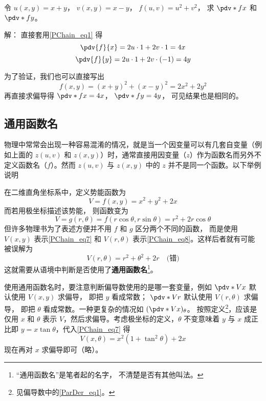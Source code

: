 \begin{example}{}
令 $u(x,y) = x + y$， $v(x,y) = x - y$， $f(u, v) = u^2 + v^2$， 求 $\pdv*{f}{x}$ 和 $\pdv*{f}{y}$。

解： 直接套用\autoref{PChain_eq1} 得
\begin{equation}
\pdv{f}{x} = 2u \cdot 1 + 2v \cdot 1 = 4x
\end{equation}
\begin{equation}
\pdv{f}{y} = 2u \cdot 1 + 2v \cdot (-1) = 4y
\end{equation}

为了验证，我们也可以直接写出
\begin{equation}
f(x, y) = (x+y)^2 + (x-y)^2 = 2x^2 + 2y^2
\end{equation}
再直接求偏导得 $\pdv*{f}{x} = 4x$， $\pdv*{f}{y} = 4y$， 可见结果也是相同的。
\end{example}

\subsection{通用函数名}
物理中常常会出现一种容易混淆的情况，就是当一个因变量可以有几套自变量（例如上面的 $z(u,v)$ 和 $z(x,y)$）时，通常直接用因变量（$z$）作为函数名而另外不定义函数名（$f$）。然而 $z(u,v)$ 与 $z(x,y)$ 中的 $z$ 并不是同一个函数。以下举例说明

\begin{example}{}\label{PChain_ex1}
在二维直角坐标系中，定义势能函数为
\begin{equation}\label{PChain_eq7}
V=f(x,y)=x^2+y^2+2x
\end{equation}
而若用极坐标描述该势能， 则函数变为
\begin{equation}\label{PChain_eq8}
V = g(r,\theta) = f(r\cos \theta , r\sin \theta ) = r^2 + 2r\cos \theta
\end{equation}
但许多物理书为了表述方便并不用 $f$ 和 $g$ 区分两个不同的函数， 而是使用 $V(x,y)$ 表示\autoref{PChain_eq7} 和 $V(r,\theta)$ 表示\autoref{PChain_eq8}。这样后者就有可能被误解为
\begin{equation}
V(r,\theta) = r^2+\theta^2+2r \quad \text{(错)}
\end{equation}
这就需要从语境中判断是否使用了\textbf{通用函数名}\footnote{“通用函数名”是笔者起的名字， 不清楚是否有其他叫法。}。

使用通用函数名时，要注意判断偏导数使用的是哪一套变量，例如 $\pdv*{V}{x}$ 默认使用 $V(x,y)$ 求偏导， 即把 $y$ 看成常数； $\pdv*{V}{r}$ 默认使用 $V(r,\theta)$ 求偏导， 即把 $\theta$ 看成常数。一种更复杂的情况如 $(\pdv*{V}{x})_\theta$。 按照定义\footnote{见偏导数中的\autoref{ParDer_eq1}。}，应该是仅用 $x$ 和 $\theta$ 表示 $V$，然后求偏导。考虑极坐标的定义，$\theta$ 不变意味着 $y$ 与 $x$ 成正比即 $y=x\tan\theta$，代入\autoref{PChain_eq7} 得
\begin{equation}
V(x,\theta)=x^2(1+\tan^2 \theta) + 2x
\end{equation}
现在再对 $x$ 求偏导即可（略）。
\end{example}

